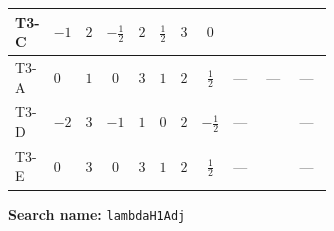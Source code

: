 \documentclass[8pt]{article}
\begin{document}
\begin{landscape}
\begin{longtable}{@{}llcccccc >{\raggedright\arraybackslash}p{0.21\linewidth} >{\raggedright\arraybackslash}p{0.21\linewidth} >{\raggedright\arraybackslash}p{0.21\linewidth}@{}}
\midrule
T3-C & $-1$ & $2$ & $-\frac{1}{2}$ & $2$ & $\frac{1}{2}$ & $3$ & $0$ & \scriptsize\adjustbox{max width=\linewidth}{$\begin{gathered} -\frac{4}{3} {\lambda_{H H^\dagger S_1^\dagger S_2^\dagger}^{\rm Cross}} (2 \left({\lambda_{H H^\dagger S_1^\dagger S_2^\dagger}^{\rm Cross}}\right)^{*}+\left({\lambda_{S_1 S_1^{\dagger 2}S_2^\dagger}}\right)^{*})\end{gathered}$} & \scriptsize\adjustbox{max width=\linewidth}{$\begin{gathered} +\frac{16}{3} {\lambda_{T3}} \left({\lambda_{T3}}\right)^{*}\end{gathered}$} & \scriptsize\adjustbox{max width=\linewidth}{$\begin{gathered} +{g_Y}^2 \left(-6 {g_2}^2-3 {\lambda_{H1}^{\rm Adj}}\right)\end{gathered}$} \\
\midrule
T3-A & $0$ & $1$ & $0$ & $3$ & $1$ & $2$ & $\frac{1}{2}$ & --- & --- & --- \\
\midrule
T3-D & $-2$ & $3$ & $-1$ & $1$ & $0$ & $2$ & $-\frac{1}{2}$ & --- & \scriptsize\adjustbox{max width=\linewidth}{$\begin{gathered} -\frac{8}{3} {\lambda_{T3}} \left({\lambda_{T3}}\right)^{*}\end{gathered}$} & --- \\
\midrule
T3-E & $0$ & $3$ & $0$ & $3$ & $1$ & $2$ & $\frac{1}{2}$ & --- & \scriptsize\adjustbox{max width=\linewidth}{$\begin{gathered} -\frac{4}{3} {\lambda_{T3}} \left({\lambda_{T3}}\right)^{*}\end{gathered}$} & --- \\
\midrule
\bottomrule
\end{longtable}
\clearpage
\noindent\textbf{Search name: }\texttt{lambdaH1Adj}\par\smallskip

\end{landscape}
\end{document}
